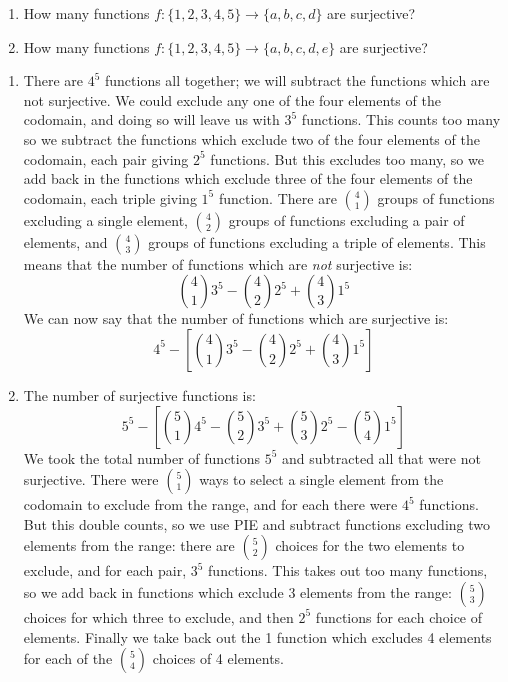 \documentclass[12pt]{article}
\begin{document}
\begin{example}
  \begin{enumerate}
    \item How many functions $f: \{1,2,3,4,5\} \to \{a,b,c,d\}$ are surjective?
    \item How many functions $f: \{1,2,3,4,5\} \to \{a,b,c,d,e\}$ are surjective?
  \end{enumerate}
\begin{solution}
  \begin{enumerate}
    \item There are $4^5$ functions all together; we will subtract the functions which are not surjective.  We could exclude any one of the four elements of the codomain, and doing so will leave us with $3^5$ functions.  This counts too many so we subtract the functions which exclude two of the four elements of the codomain, each pair giving $2^5$ functions.  But this excludes too many, so we add back in the functions which exclude three of the four elements of the codomain, each triple giving $1^5$ function.  There are ${4 \choose 1}$ groups of functions excluding a single element, ${4 \choose 2}$ groups of functions excluding a pair of elements, and ${4 \choose 3}$ groups of functions excluding a triple of elements.  This means that the number of functions which are {\em not} surjective is:
    \[{4 \choose 1}3^5 - {4 \choose 2}2^5 + {4 \choose 3}1^5\]
    We can now say that the number of functions which are surjective is:
    \[4^5 - \left[{4 \choose 1}3^5 - {4 \choose 2}2^5 + {4 \choose 3}1^5\right]\]
    
    \item The number of surjective functions is:
    \[5^5 - \left[{5 \choose 1}4^5 - {5 \choose 2}3^5 + {5 \choose 3}2^5 - {5 \choose 4}1^5\right]\]
    We took the total number of functions $5^5$ and subtracted all that were not surjective.  There were ${5 \choose 1}$ ways to select a single element from the codomain to exclude from the range, and for each there were $4^5$ functions.  But this double counts, so we use PIE and subtract functions excluding two elements from the range: there are ${5 \choose 2}$ choices for the two elements to exclude, and for each pair, $3^5$ functions.  This takes out too many functions, so we add back in functions which exclude 3 elements from the range: ${5 \choose 3}$ choices for which three to exclude, and then $2^5$ functions for each choice of elements.  Finally we take back out the 1 function which excludes 4 elements for each of the ${5 \choose 4}$ choices of 4 elements.
  \end{enumerate}

\end{solution}

\end{example}
\end{document}
